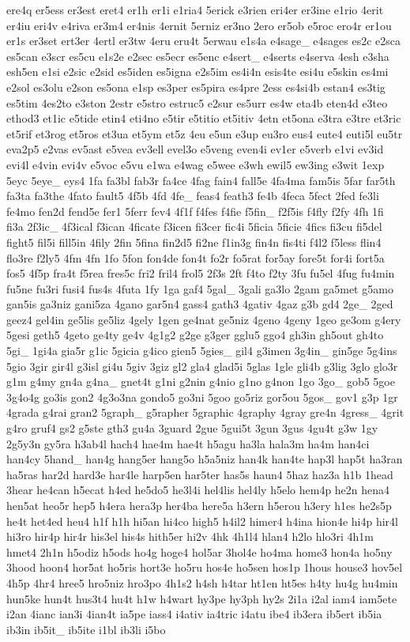\begin{DoxyCompactItemize}
ere4q er5ess er3est eret4 er1h er1i e1ria4 5erick e3rien eri4er er3ine e1rio 4erit er4iu eri4v e4riva er3m4 er4nis 4ernit 5erniz er3no 2ero er5ob e5roc ero4r er1ou er1s er3set ert3er 4ertl er3tw 4eru eru4t 5erwau e1s4a e4sage\-\_\- e4sages es2c e2sca es5can e3scr es5cu e1s2e e2sec es5ecr es5enc e4sert\-\_\- e4serts e4serva 4esh e3sha esh5en e1si e2sic e2sid es5iden es5igna e2s5im es4i4n esis4te esi4u e5skin es4mi e2sol es3olu e2son es5ona e1sp es3per es5pira es4pre 2ess es4si4b estan4 es3tig es5tim 4es2to e3ston 2estr e5stro estruc5 e2sur es5urr es4w eta4b eten4d e3teo ethod3 et1ic e5tide etin4 eti4no e5tir e5titio et5itiv 4etn et5ona e3tra e3tre et3ric et5rif et3rog et5ros et3ua et5ym et5z 4eu e5un e3up eu3ro eus4 eute4 euti5l eu5tr eva2p5 e2vas ev5ast e5vea ev3ell evel3o e5veng even4i ev1er e5verb e1vi ev3id evi4l e4vin evi4v e5voc e5vu e1wa e4wag e5wee e3wh ewil5 ew3ing e3wit 1exp 5eyc 5eye\-\_\- eys4 1fa fa3bl fab3r fa4ce 4fag fain4 fall5e 4fa4ma fam5is 5far far5th fa3ta fa3the 4fato fault5 4f5b 4fd 4fe\-\_\- feas4 feath3 fe4b 4feca 5fect 2fed fe3li fe4mo fen2d fend5e fer1 5ferr fev4 4f1f f4fes f4fie f5fin\-\_\- f2f5is f4fly f2fy 4fh 1fi fi3a 2f3ic\-\_\- 4f3ical f3ican 4ficate f3icen fi3cer fic4i 5ficia 5ficie 4fics fi3cu fi5del fight5 fil5i fill5in 4fily 2fin 5fina fin2d5 fi2ne f1in3g fin4n fis4ti f4l2 f5less flin4 flo3re f2ly5 4fm 4fn 1fo 5fon fon4de fon4t fo2r fo5rat for5ay fore5t for4i fort5a fos5 4f5p fra4t f5rea fres5c fri2 fril4 frol5 2f3s 2ft f4to f2ty 3fu fu5el 4fug fu4min fu5ne fu3ri fusi4 fus4s 4futa 1fy 1ga gaf4 5gal\-\_\- 3gali ga3lo 2gam ga5met g5amo gan5is ga3niz gani5za 4gano gar5n4 gass4 gath3 4gativ 4gaz g3b gd4 2ge\-\_\- 2ged geez4 gel4in ge5lis ge5liz 4gely 1gen ge4nat ge5niz 4geno 4geny 1geo ge3om g4ery 5gesi geth5 4geto ge4ty ge4v 4g1g2 g2ge g3ger gglu5 ggo4 gh3in gh5out gh4to 5gi\-\_\- 1gi4a gia5r g1ic 5gicia g4ico gien5 5gies\-\_\- gil4 g3imen 3g4in\-\_\- gin5ge 5g4ins 5gio 3gir gir4l g3isl gi4u 5giv 3giz gl2 gla4 glad5i 5glas 1gle gli4b g3lig 3glo glo3r g1m g4my gn4a g4na\-\_\- gnet4t g1ni g2nin g4nio g1no g4non 1go 3go\-\_\- gob5 5goe 3g4o4g go3is gon2 4g3o3na gondo5 go3ni 5goo go5riz gor5ou 5gos\-\_\- gov1 g3p 1gr 4grada g4rai gran2 5graph\-\_\- g5rapher 5graphic 4graphy 4gray gre4n 4gress\-\_\- 4grit g4ro gruf4 gs2 g5ste gth3 gu4a 3guard 2gue 5gui5t 3gun 3gus 4gu4t g3w 1gy 2g5y3n gy5ra h3ab4l hach4 hae4m hae4t h5agu ha3la hala3m ha4m han4ci han4cy 5hand\-\_\- han4g hang5er hang5o h5a5niz han4k han4te hap3l hap5t ha3ran ha5ras har2d hard3e har4le harp5en har5ter has5s haun4 5haz haz3a h1b 1head 3hear he4can h5ecat h4ed he5do5 he3l4i hel4lis hel4ly h5elo hem4p he2n hena4 hen5at heo5r hep5 h4era hera3p her4ba here5a h3ern h5erou h3ery h1es he2s5p he4t het4ed heu4 h1f h1h hi5an hi4co high5 h4il2 himer4 h4ina hion4e hi4p hir4l hi3ro hir4p hir4r his3el his4s hith5er hi2v 4hk 4h1l4 hlan4 h2lo hlo3ri 4h1m hmet4 2h1n h5odiz h5ods ho4g hoge4 hol5ar 3hol4e ho4ma home3 hon4a ho5ny 3hood hoon4 hor5at ho5ris hort3e ho5ru hos4e ho5sen hos1p 1hous house3 hov5el 4h5p 4hr4 hree5 hro5niz hro3po 4h1s2 h4sh h4tar ht1en ht5es h4ty hu4g hu4min hun5ke hun4t hus3t4 hu4t h1w h4wart hy3pe hy3ph hy2s 2i1a i2al iam4 iam5ete i2an 4ianc ian3i 4ian4t ia5pe iass4 i4ativ ia4tric i4atu ibe4 ib3era ib5ert ib5ia ib3in ib5it\-\_\- ib5ite i1bl ib3li i5bo 
\end{DoxyCompactItemize}
